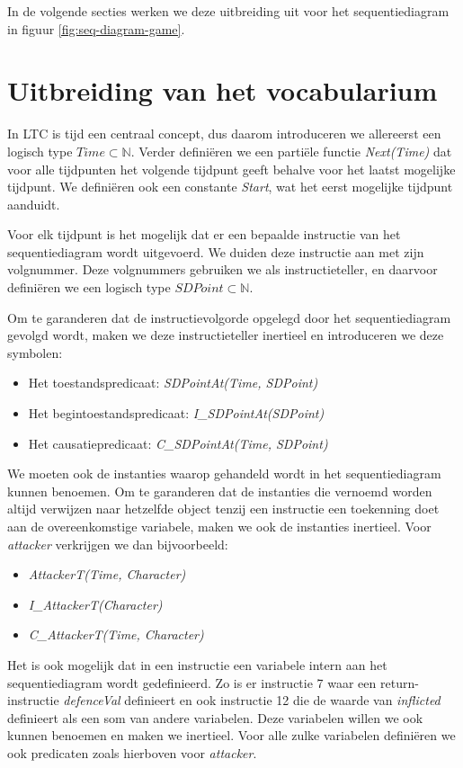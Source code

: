 In de volgende secties werken we deze uitbreiding uit voor het sequentiediagram in figuur \ref{fig:seq-diagram-game}.

\section{Uitbreiding van het vocabularium}
In LTC is tijd een centraal concept, dus daarom introduceren we allereerst een logisch type $Time \subset \mathbb{N}$. Verder defini\"eren we een parti\"ele functie \textit{Next(Time)} dat voor alle tijdpunten het volgende tijdpunt geeft behalve voor het laatst mogelijke tijdpunt. We defini\"eren ook een constante \textit{Start}, wat het eerst mogelijke tijdpunt aanduidt.

Voor elk tijdpunt is het mogelijk dat er een bepaalde instructie van het sequentiediagram wordt uitgevoerd. We duiden deze instructie aan met zijn volgnummer.
Deze volgnummers gebruiken we als instructieteller, en daarvoor defini\"eren we een logisch type $SDPoint \subset \mathbb{N}$.

Om te garanderen dat de instructievolgorde opgelegd door het sequentiediagram gevolgd wordt, maken we deze instructieteller inertieel en introduceren we deze symbolen:

\begin{itemize}
	\item Het toestandspredicaat: \textit{SDPointAt(Time, SDPoint)}
	\item Het begintoestandspredicaat: \textit{I\_SDPointAt(SDPoint)}
	\item Het causatiepredicaat: \textit{C\_SDPointAt(Time, SDPoint)}
\end{itemize}

We moeten ook de instanties waarop gehandeld wordt in het sequentiediagram kunnen benoemen. Om te garanderen dat de instanties die vernoemd worden altijd verwijzen naar hetzelfde object tenzij een instructie een toekenning doet aan de overeenkomstige variabele, maken we ook de instanties inertieel. Voor \textit{attacker} verkrijgen we dan bijvoorbeeld:

\begin{itemize}
	\item \textit{AttackerT(Time, Character)}
	\item \textit{I\_AttackerT(Character)}
	\item \textit{C\_AttackerT(Time, Character)}
\end{itemize}

Het is ook mogelijk dat in een instructie een variabele intern aan het sequentiediagram wordt gedefinieerd. Zo is er instructie 7 waar een return-instructie \textit{defenceVal} definieert en ook instructie 12 die de waarde van \textit{inflicted} definieert als een som van andere variabelen. Deze variabelen willen we ook kunnen benoemen en maken we inertieel. Voor alle zulke variabelen defini\"eren we ook predicaten zoals hierboven voor \textit{attacker}.


